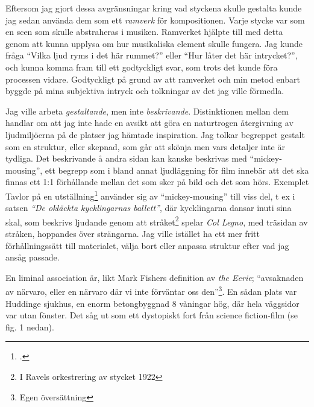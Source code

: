 \documentclass{article}
\begin{document}
Eftersom jag gjort dessa avgränsningar kring vad styckena skulle gestalta kunde jag sedan använda dem som ett
\emph{ramverk} för kompositionen. Varje stycke var som en scen som skulle abstraheras i musiken. Ramverket
hjälpte till med detta genom att kunna upplysa om hur musikaliska element skulle fungera. Jag kunde fråga 
``Vilka ljud ryms i det här rummet?'' eller ``Hur låter det här intrycket?'', och kunna komma fram
till ett godtyckligt svar, som trots det kunde föra processen vidare. Godtyckligt på grund av att ramverket
och min metod enbart byggde på mina subjektiva intryck och tolkningar av det jag ville förmedla.


Jag ville arbeta \emph{gestaltande}, men inte \emph{beskrivande}. Distinktionen mellan dem handlar om att jag
inte hade en avsikt att göra en naturtrogen återgivning av ljudmiljöerna på de platser jag hämtade
inspiration. Jag tolkar begreppet gestalt som en struktur, eller skepnad, som går att skönja men vars detaljer
inte är tydliga. Det beskrivande å andra sidan kan kanske beskrivas med ``mickey-mousing'', ett begrepp som i
bland annat ljudläggning för film innebär att det ska finnas ett 1:1 förhållande mellan det som sker på bild
och det som hörs. Exemplet Tavlor på en utställning\footcite{Tavlor} använder sig av ``mickey-mousing'' till
viss del, t ex i satsen \emph{``De okläckta kycklingarnas ballett''}, där kycklingarna dansar inuti sina skal,
som beskrivs ljudande genom att stråket\footnote{I Ravels orkestrering av stycket 1922} spelar \emph{Col
Legno}, med träsidan av stråken, hoppandes över strängarna. Jag ville istället ha ett mer fritt
förhållningssätt till materialet, välja bort eller anpassa struktur efter vad jag ansåg passade.

En liminal association är, likt Mark Fishers definition av \emph{the Eerie};
``avsaknaden av närvaro, eller en närvaro där vi inte förväntar oss den''\footnote{Egen översättning}. En
sådan plats var Huddinge sjukhus, en enorm betongbyggnad 8 våningar hög, där hela väggsidor var utan fönster.
Det såg ut som ett dystopiskt fort från science fiction-film (se fig. 1 nedan). 
\end{document}

